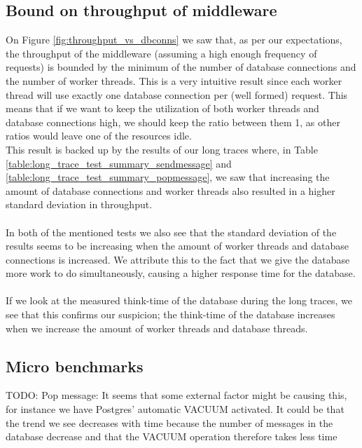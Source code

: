 \documentclass{article}
\begin{document}
\begin{table}
\begin{table}
\begin{table}
        \subsection{Bound on throughput of middleware}
            \label{sec:analysis_bound_on_throughput}
            On Figure \ref{fig:throughput_vs_dbconns} we saw that, as per our expectations, the throughput of the middleware (assuming a high enough frequency of requests) is bounded by the minimum of the number of database connections and the number of worker threads. This is a very intuitive result since each worker thread will use exactly one database connection per (well formed) request. This means that if we want to keep the utilization of both worker threads and database connections high, we should keep the ratio between them 1, as other ratios would leave one of the resources idle.\\
            This result is backed up by the results of our long traces where, in Table \ref{table:long_trace_test_summary_sendmessage} and \ref{table:long_trace_test_summary_popmessage}, we saw that increasing the amount of database connections and worker threads also resulted in a higher standard deviation in throughput.\\
            \\
            In both of the mentioned tests we also see that the standard deviation of the results seems to be increasing when the amount of worker threads and database connections is increased. We attribute this to the fact that we give the database more work to do simultaneously, causing a higher response time for the database.\\
            \\
            If we look at the measured think-time of the database during the long traces, we see that this confirms our suspicion; the think-time of the database increases when we increase the amount of worker threads and database threads.

        \subsection{Micro benchmarks}
            \label{sec:analysis_micro_benchmarks}
            TODO: Pop message: It seems that some external factor might be causing this, for instance we have Postgres' automatic VACUUM activated. It could be that the trend we see decreases with time because the number of messages in the database decrease and that the VACUUM operation therefore takes less time


\end{table}
\end{table}
\end{table}
\end{document}
